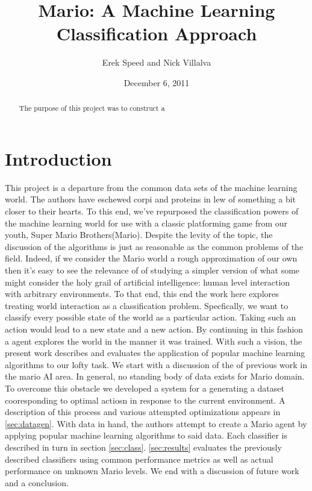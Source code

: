 \documentclass[]{article}   %
\begin{document}
\title{Mario: A Machine Learning Classification Approach}   %

\author{Erek Speed and Nick Villalva}         %
\date{December 6, 2011}    %
\maketitle

\begin{abstract}
 The purpose of this project was to construct a 
\end{abstract}

\section{Introduction}     %
This project is a departure from the common data sets of the machine learning world. The authors have eschewed corpi and proteins in lew of something a bit closer to their hearts.  To this end, we've repurposed the classification powers of the machine learning world for use with a classic platforming game from our youth, Super Mario Brothers(Mario).  Despite the levity of the topic, the discussion of the algorithms is just as reasonable as the common problems of the field.  Indeed, if we consider the Mario world a rough approximation of our own then it's easy to see the relevance of of studying a simpler version of what some might consider the holy grail of artificial intelligence: human level interaction with arbitrary environments.
\newline\newline
To that end, this end the work here explores treating world interaction as a classification problem.  Specfically, we want to classify every possible state of the world as a particular action. Taking such an action would lead to a new state and a new action.  By continuing in this fashion a agent explores the world in the manner it was trained.
\newline\newline
With such a vision, the present work describes and evaluates the application of popular machine learning algorithms to our lofty task.  We start with a discussion of the of previous work in the mario AI area.  In general, no standing body of data exists for Mario domain.  To overcome this obstacle we developed a system for a generating a dataset cooresponding to optimal actiosn in response to the current environment.  A description of this process and various attempted optimizations appears in \ref{sec:datagen}.  With data in hand, the authors attempt to create a Mario agent by applying popular machine learning algorithms to said data.  Each classifier is described in turn in section \ref{sec:class}.  \ref{sec:results} evaluates the previously described classifiers using common performance metrics as well as actual performance on unknown Mario levels.  We end with a discussion of future work and a conclusion.
\end{document}
